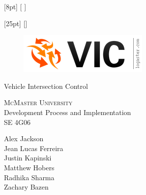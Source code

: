 \documentclass [12pt]{article}
\begin{document}
[8pt]                                               %
{}%
{\contentsmargin{2pt}                               %
     \thecontentslabel {\enspace }  %
    }
{\contentsmargin{0pt}\Large}                        %
{\contentspage} %
[ ] %

[25pt]                                               %
{}%
{\contentsmargin{0pt}                               %
    \thecontentslabel\enspace\enspace%
    }
{\contentsmargin{4pt}\large}                        %
{\contentspage} %
[] %




\begin {center} 
	
	\thispagestyle{empty}
	\vspace*{5cm}


	
	\begin {figure}[h!]
		\centering
		\includegraphics [scale = .5, trim={.4cm 0 .8cm 0},clip] {figures/vic_logo.png}
	\end {figure}

	{\fontfamily{\cabinfamily}\selectfont
	\Huge{Vehicle Intersection Control} }
	
	\vspace{1 cm}
	{\LARGE{\textsc{McMaster University}}\\}  \vspace {1cm}
	{\Large Development Process and Implementation\\ \vspace {0.5 cm} SE 4G06}  \vspace {2cm}

	{
		Alex Jackson \\
		Jean Lucas Ferreira \\
		Justin Kapinski\\
		Matthew Hobers\\
		Radhika Sharma\\
		Zachary Bazen}

	

		
	\end{center}
\pagebreak
\end{document}
